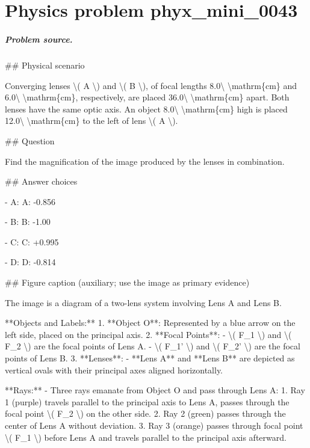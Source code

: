 
\chapter{Physics problem phyx\_mini\_0043}
\label{ch:PhyXMiniProblems_problem_phyx_mini_0043}

\paragraph{Problem source.}
\#\# Physical scenario

Converging lenses \textbackslash{}( A \textbackslash{}) and \textbackslash{}( B \textbackslash{}), of focal lengths 8.0\textbackslash{} \textbackslash{}mathrm\{cm\} and 6.0\textbackslash{} \textbackslash{}mathrm\{cm\}, respectively, are placed 36.0\textbackslash{} \textbackslash{}mathrm\{cm\} apart. Both lenses have the same optic axis. An object 8.0\textbackslash{} \textbackslash{}mathrm\{cm\} high is placed 12.0\textbackslash{} \textbackslash{}mathrm\{cm\} to the left of lens \textbackslash{}( A \textbackslash{}).

\#\# Question

Find the magnification of the image produced by the lenses in combination.

\#\# Answer choices

- A: A: -0.856

- B: B: -1.00

- C: C: +0.995

- D: D: -0.814

\#\# Figure caption (auxiliary; use the image as primary evidence)

The image is a diagram of a two-lens system involving Lens A and Lens B.

**Objects and Labels:**
1. **Object O**: Represented by a blue arrow on the left side, placed on the principal axis.
2. **Focal Points**: 
   - \textbackslash{}( F\_1 \textbackslash{}) and \textbackslash{}( F\_2 \textbackslash{}) are the focal points of Lens A.
   - \textbackslash{}( F\_1' \textbackslash{}) and \textbackslash{}( F\_2' \textbackslash{}) are the focal points of Lens B.
3. **Lenses**: 
   - **Lens A** and **Lens B** are depicted as vertical ovals with their principal axes aligned horizontally.

**Rays:**
- Three rays emanate from Object O and pass through Lens A:
  1. Ray 1 (purple) travels parallel to the principal axis to Lens A, passes through the focal point \textbackslash{}( F\_2 \textbackslash{}) on the other side.
  2. Ray 2 (green) passes through the center of Lens A without deviation.
  3. Ray 3 (orange) passes through focal point \textbackslash{}( F\_1 \textbackslash{}) before Lens A and travels parallel to the principal axis afterward.

